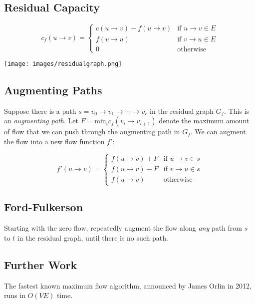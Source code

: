 \subsection{Residual Capacity}
\[
	c_f(u \rightarrow v) =
	\begin{cases}
		c(u \rightarrow v) - f(u \rightarrow v) & \text{if } u \rightarrow v \in E\\
		f(v \rightarrow u) & \text{if } v \rightarrow u \in E\\
		0 & \text{otherwise}
	\end{cases}
\]

\texttt{[image: images/residualgraph.png]}

\subsection{Augmenting Paths}
Suppose there is a path $s = v_0 \rightarrow v_1 \rightarrow \cdots \rightarrow v_r$ in the residual graph $G_f$. This is an \emph{augmenting path}. Let $F = \text{min}_i c_f(v_i \rightarrow v_{i+1})$ denote the maximum amount of flow that we can push through the augmenting path in $G_f$. We can augment the flow into a new flow function $f'$:

\[
	f'(u \rightarrow v) =
	\begin{cases}
		f(u \rightarrow v) + F & \text{if } u \rightarrow v \in s\\
		f(u \rightarrow v) - F & \text{if } v \rightarrow u \in s\\
		f(u \rightarrow v) & \text{otherwise}
	\end{cases}
\]

\subsection{Ford-Fulkerson}
Starting with the zero flow, repeatedly augment the flow along \emph{any} path from $s$ to $t$ in the residual graph, until there is no such path.

\subsection{Further Work}
The fastest known maximum flow algorithm, announced by James Orlin in 2012, runs in $O(VE)$ time.